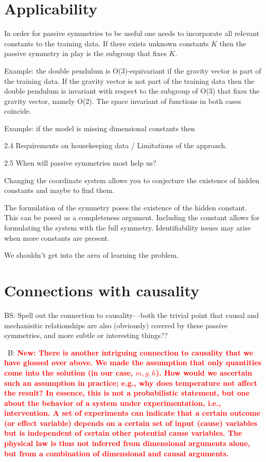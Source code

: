 \documentclass{article}
\theoremstyle{plain}
\theoremstyle{definition}
\theoremstyle{remark}
\newcommand{\bernhard}[1]{~B: \textcolor{red}{\textbf{#1}}}
\begin{document}
\section{Applicability}\label{sec:applicability}

In order for passive symmetries to be useful one needs to incorporate all relevant constants to the training data. If there exists unknown constants $K$ then the passive symmetry in play is the subgroup that fixes $K$.

Example: the double pendulum is O(3)-equivariant if the gravity vector is part of the training data. If the gravity vector is not part of the training data then the double pendulum is invariant with respect to the subgroup of O(3) that fixes the gravity vector, namely O(2). The space invariant of functions in both cases coincide.

Example: if the model is missing dimensional constants then 

   2.4 Requirements on housekeeping data / Limitations of the approach.

   2.5 When will passive symmetries most help us?
   
   Changing the coordinate system allows you to conjecture the existence of hidden constants and maybe to find them. 
   
   The formulation of the symmetry poses the existence of the hidden constant. This can be posed as a completeness argument. Including the constant allows for formulating the system with the full symmetry.
   Identifiability issues may arise when more constants are present.
   
   We shouldn't get into the area of learning the problem. 


\section{Connections with causality}

BS: Spell out the connection to causality---both the trivial point that causal and mechanisitic relationships are also (obviously) covered by these passive symmetries, and more subtle or interesting things??

\bernhard{New: There is another intriguing connection to causality that we have glossed over above.
We made the assumption that only quantities come into the solution (in our case, $m, g, h$). How would we ascertain such an assumption in practice; e.g., why does temperature not affect the result? In essence, this is not a probabilistic statement, but one about the behavior of a system under experimentation, i.e., intervention. A set of experiments can indicate that a certain outcome (or effect variable) depends on a certain set of input (cause) variables but is independent of certain other potential cause variables. The physical law is thus not inferred from dimensional arguments alone, but from a combination of dimensional and causal arguments.}
\end{document}

